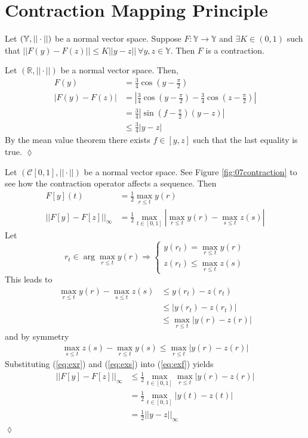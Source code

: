 \section{Contraction Mapping Principle}
\begin{definition}
Let $(\mathbb{Y},||\cdot||)$ be a normal vector space. Suppose $F:\mathbb{Y}\to\mathbb{Y}$ and $\exists K\in(0,1)$ such that $||F(y)-F(z)||\leq K||y-z|| ~\forall y,z\in\mathbb{Y}$. Then $F$ is a contraction.
\end{definition}

\begin{example}
Let $(\mathbb{R},||\cdot||)$ be a normal vector space. Then,
\begin{align*}
F(y) &= \frac{3}{4}\cos(y-\frac{\pi}{2}) \\
|F(y)-F(z)| &= \left|\frac{3}{4}\cos(y-\frac{\pi}{2})-\frac{3}{4}\cos(z-\frac{\pi}{2})\right| \\
&= \frac{3}{4}\left|\sin(f-\frac{\pi}{2})(y-z)\right| \\
&\leq \frac{3}{4}|y-z|
\end{align*}
By the mean value theorem there exists $f\in[y,z]$ such that the last equality is true.
$\lozenge$
\end{example}

\begin{example}
Let $(\mathcal{C}[0,1],||\cdot||)$ be a normal vector space. See Figure \ref{fig:07contraction} to see how the contraction operator affects a sequence. Then
\begin{align}
\label{eq:exf}
F[y](t) &= \frac{1}{2}\max_{r\leq t}y(r) \nonumber \\
||F[y]-F[z]||_\infty &= \frac{1}{2}\max_{t\in[0,1]}|\max_{r\leq t}y(r)-\max_{s\leq t}z(s)|
\end{align}
Let
$$r_t\in\arg\max_{r\leq t}y(r) \Rightarrow \begin{cases} y(r_t) = \max_{r\leq t}y(r) \\ z(r_t)\leq\max_{r\leq t}z(s) \end{cases}$$
This leads to
\begin{align}
\label{eq:exr}
\max_{r\leq t}y(r)-\max_{s\leq t}z(s) &\leq y(r_t)-z(r_t) \nonumber \\
&\leq |y(r_t)-z(r_t)| \nonumber \\
&\leq \max_{r\leq t}|y(r)-z(r)|
\end{align}
and by symmetry
\begin{align}
\label{eq:exs}
\max_{s\leq t}z(s)-\max_{r\leq t}y(s) \leq \max_{r\leq t}|y(r)-z(r)|
\end{align}
Substituting (\ref{eq:exr}) and (\ref{eq:exs}) into (\ref{eq:exf}) yields
\begin{align*}
||F[y]-F[z]||_\infty &\leq \frac{1}{2}\max_{t\in[0,1]}\max_{r\leq t}|y(r)-z(r)| \\
&= \frac{1}{2}\max_{t\in[0,1]}|y(t)-z(t)| \\
&= \frac{1}{2}||y-z||_\infty
\end{align*}
$\lozenge$
\end{example}

